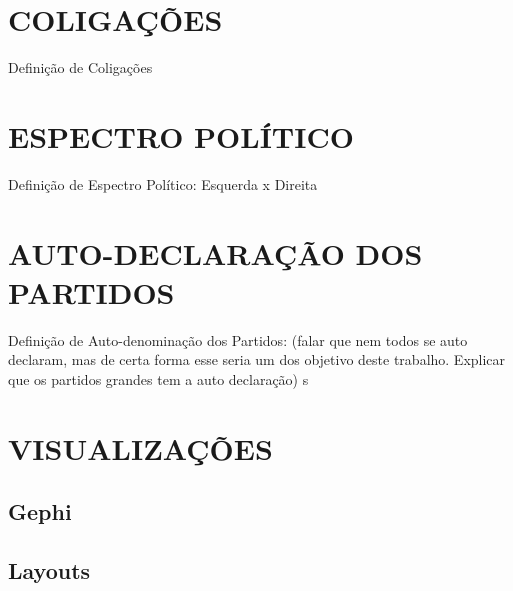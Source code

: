 \section{\texorpdfstring{\MakeUppercase{Coligações}}{}}
\label{conceitos__coligacoes}

Definição de Coligações





\section{\texorpdfstring{\MakeUppercase{Espectro Político}}{}}
\label{conceitos__espectro-politico}

Definição de Espectro Político: Esquerda x Direita


\section{\texorpdfstring{\MakeUppercase{Auto-declaração dos Partidos}}{}}
\label{conceitos__auto-declaracao-partidos}

Definição de Auto-denominação dos Partidos: (falar que nem todos se auto declaram, mas de certa forma esse seria um dos objetivo deste trabalho. Explicar que os partidos grandes tem a auto declaração)
s

\section{\texorpdfstring{\MakeUppercase{Visualizações}}{}}
\label{conceitos__visualizacoes}
\subsection{Gephi}
\label{conceitos__visualizacoes--gephi}


\subsection{Layouts}
\label{conceitos__visualizacoes--layouts}

